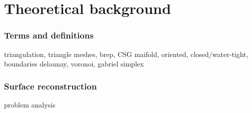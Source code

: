 \chapter{Theoretical background}

\subsection{Terms and definitions}

triangulation,
triangle meshes,
brep, CSG
maifold, oriented, closed/water-tight, boundaries
delaunay, voronoi, gabriel simplex


\subsection{Surface reconstruction}
problem analysis



